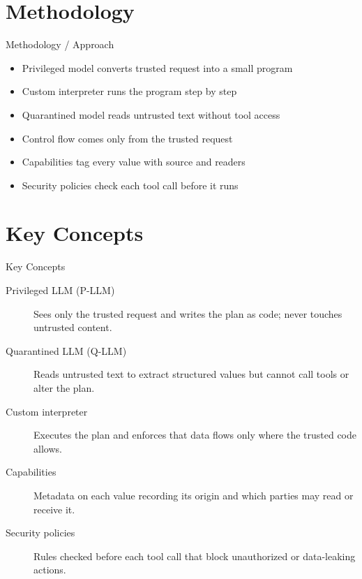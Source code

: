 \documentclass[10pt]{beamer}
\begin{document}
\section{Methodology}
\begin{frame}[allowframebreaks]{Methodology / Approach}
\begin{itemize}
  \item Privileged model converts trusted request into a small program
  \item Custom interpreter runs the program step by step
  \item Quarantined model reads untrusted text without tool access
  \item Control flow comes only from the trusted request
  \item Capabilities tag every value with source and readers
  \item Security policies check each tool call before it runs
\end{itemize}
\end{frame}

\section{Key Concepts}
\begin{frame}[allowframebreaks]{Key Concepts}
  \begin{description}
    \item[Privileged LLM (P-LLM)] Sees only the trusted request and writes the plan as code; never touches untrusted content.
    \item[Quarantined LLM (Q-LLM)] Reads untrusted text to extract structured values but cannot call tools or alter the plan.
    \item[Custom interpreter] Executes the plan and enforces that data flows only where the trusted code allows.
    \item[Capabilities] Metadata on each value recording its origin and which parties may read or receive it.
    \item[Security policies] Rules checked before each tool call that block unauthorized or data-leaking actions.
  \end{description}
\end{frame}
\end{document}
